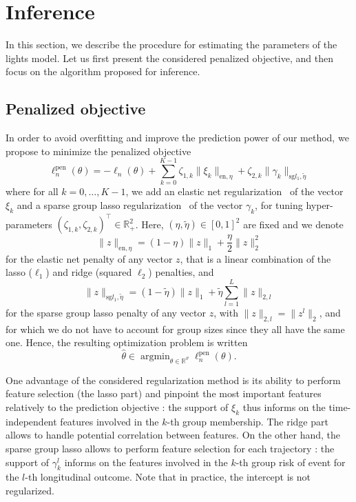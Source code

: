 \documentclass[11pt]{article}
\DeclareMathOperator{\argmin}{argmin}
\newcommand{\norm}[1]{\|#1\|}
\newcommand{\R}{\mathds R}
\begin{document}
\section{Inference}
\label{sec:inference}

In this section, we describe the procedure for estimating the parameters of the lights model. Let us first present the considered penalized objective, and then focus on the algorithm proposed for inference.

\subsection{Penalized objective}
\label{sec:penalized-obj}

In order to avoid overfitting and improve the prediction power of our method, we propose to minimize the penalized objective
\begin{equation}
  \label{eq:pen-log-lik}
	\ell_n^\text{pen}(\theta) = - \ell_n(\theta) + \sum_{k=0}^{K-1} \zeta_{1,k} \norm{\xi_k}_{\text{en}, \eta} + \zeta_{2,k} \norm{\gamma_k}_{\text{sg} l_1, \tilde{\eta}}
\end{equation}
where for all $k=0, \ldots, K-1$, we add an elastic net regularization~\citep{zou2005regularization} of the vector $\xi_k$ and a sparse group lasso regularization~\citep{simon2013sparse} of the vector $\gamma_k$, for tuning hyper-parameters $(\zeta_{1,k}, \zeta_{2,k})^\top \in \R_+^2$. Here, $(\eta, \tilde{\eta}) \in [0, 1]^2$ are fixed and we denote
\[ \norm{z}_{\text{en}, \eta} = (1-\eta)\norm{z}_1 + \dfrac\eta2 \norm{z}_2^2 \]
for the elastic net penalty of any vector $z$, that is a linear combination of the lasso ($\ell_1$) and ridge (squared $\ell_2$) penalties, and
\[ \norm{z}_{\text{sg} l_1, \tilde{\eta}} = (1-\tilde{\eta})\norm{z}_1 + \tilde{\eta} \sum_{l=1}^L\norm{z}_{2,l} \] for the sparse group lasso penalty of any vector $z$, with $\norm{z}_{2,l}=\norm{z^l}_2$, and for which we do not have to account for group sizes since they all have the same one. 
Hence, the resulting optimization problem is written
\begin{equation}
  \label{eq:optim-pb}
   \hat \theta \in \argmin_{\theta \in \R^\vartheta} \ell_n^\text{pen}(\theta).
 \end{equation}

One advantage of the considered regularization method is its ability to perform feature selection (the lasso part) and pinpoint the most important features relatively to the prediction objective : the support of $\xi_k$ thus informs on the time-independent features involved in the $k$-th group membership. The ridge part allows to handle potential correlation between features.
On the other hand, the sparse group lasso allows to perform feature selection for each trajectory : the support of $\gamma_k^l$ informs on the features involved in the $k$-th group risk of event for the $l$-th longitudinal outcome.
Note that in practice, the intercept is not regularized.
\end{document}

